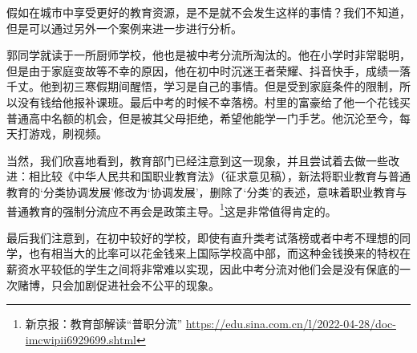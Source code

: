 \documentclass[12pt,UTF8]{ctexart}
\begin{document}
\par{假如在城市中享受更好的教育资源，是不是就不会发生这样的事情？我们不知道，但是可以通过另外一个案例来进一步进行分析。}
\par{郭同学就读于一所厨师学校，他也是被中考分流所淘汰的。他在小学时非常聪明，但是由于家庭变故等不幸的原因，他在初中时沉迷王者荣耀、抖音快手，成绩一落千丈。他到初三寒假期间醒悟，学习是自己的事情。但是受到家庭条件的限制，所以没有钱给他报补课班。最后中考的时候不幸落榜。村里的富豪给了他一个花钱买普通高中名额的机会，但是被其父母拒绝，希望他能学一门手艺。他沉沦至今，每天打游戏，刷视频。}
\par{当然，我们欣喜地看到，教育部门已经注意到这一现象，并且尝试着去做一些改进：相比较《中华人民共和国职业教育法》（征求意见稿），新法将职业教育与普通教育的‘分类协调发展’修改为‘协调发展’，删除了‘分类’的表述，意味着职业教育与普通教育的强制分流应不再会是政策主导。\footnote{新京报：教育部解读“普职分流”
		\url{https://edu.sina.com.cn/l/2022-04-28/doc-imcwipii6929699.shtml}}这是非常值得肯定的。}
\par{最后我们注意到，在初中较好的学校，即使有直升类考试落榜或者中考不理想的同学，也有相当大的比率可以花金钱来上国际学校高中部，而这种金钱换来的特权在薪资水平较低的学生之间将非常难以实现，因此中考分流对他们会是没有保底的一次赌博，只会加剧促进社会不公平的现象。}
\end{document}
